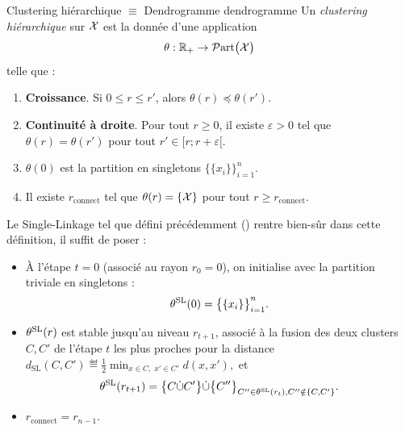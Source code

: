\begin{Definition}{Clustering hiérarchique $\equiv$ Dendrogramme \cite{CarlssonMemoli2010}}{dendrogramme}
Un \emph{clustering hiérarchique} sur $\mathcal{X}$ est la donnée d'une application
$$\theta : \mathbb{R}_{+} \to \mathcal{P}\mathrm{art}\bigl( \mathcal{X} \bigr)$$
telle que :
\begin{enumerate}[label=(\roman*)]
    \item \textbf{Croissance}. Si $0\le r\le r'$, alors $\theta(r)\preceq \theta(r')$.
    \item \textbf{Continuité à droite}. Pour tout $r\ge0$, il existe $\varepsilon>0$ tel que
    $\theta(r)=\theta(r')$ pour tout $r'\in[r ; r+\varepsilon[$.
    \item $\theta(0)$ est la partition en singletons $\bigl\{\{x_i\}\bigr\}_{i=1}^n$.
    \item Il existe $r_{\mathrm{connect}}$ tel que $\theta(r)=\{\mathcal{X}\}$ pour tout $r\ge r_{\mathrm{connect}}$.
\end{enumerate}
\end{Definition}

Le Single-Linkage tel que défini précédemment () rentre bien-sûr dans cette définition, il suffit de poser :
\begin{itemize}
    \item À l'étape $t=0$ (associé au rayon $r_0 = 0$), on initialise avec la partition triviale en singletons :
    \[
        \theta^{\mathrm{SL}}(0) = \bigl\{\{x_i\}\bigr\}_{i=1}^{n}.
    \]
    \item  $\theta^{\mathrm{SL}}(r)$ est stable jusqu'au niveau $r_{t+1}$, associé à la fusion des deux clusters $C,C'$ de l'étape $t$ les plus proches pour la distance
$
    d_{\mathrm{SL}}(C,C') \eqdef \frac12\min_{x\in C,\;x'\in C'}d(x,x'),
$ et 
\[
    \theta^{\mathrm{SL}}(r_{t+1}) = \bigl\{C \dot\cup C' \bigr\} \dot\cup \bigl\{C'' \bigr\}_{C'' \in \theta^{\mathrm{SL}}(r_t), C'' \notin \{C,C'\}}.
\]
    \item $r_{\mathrm{connect}} = r_{n-1}.$
\end{itemize}


